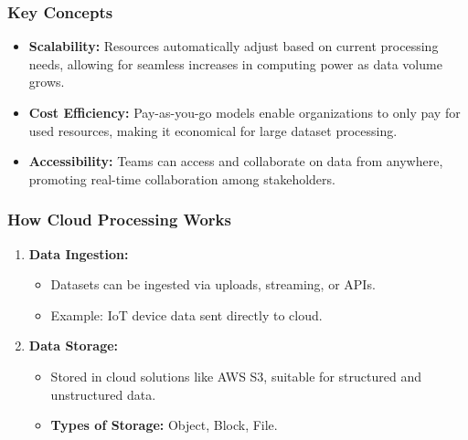 \documentclass[aspectratio=169]{beamer}
\begin{document}
\begin{frame}[fragile]
    \frametitle{Key Concepts}
    \begin{itemize}
        \item \textbf{Scalability:} Resources automatically adjust based on current processing needs, allowing for seamless increases in computing power as data volume grows.
        \item \textbf{Cost Efficiency:} Pay-as-you-go models enable organizations to only pay for used resources, making it economical for large dataset processing.
        \item \textbf{Accessibility:} Teams can access and collaborate on data from anywhere, promoting real-time collaboration among stakeholders.
    \end{itemize}
\end{frame}

\begin{frame}[fragile]
    \frametitle{How Cloud Processing Works}
    \begin{enumerate}
        \item \textbf{Data Ingestion:}
            \begin{itemize}
                \item Datasets can be ingested via uploads, streaming, or APIs.
                \item Example: IoT device data sent directly to cloud.
            \end{itemize}
        \item \textbf{Data Storage:}
            \begin{itemize}
                \item Stored in cloud solutions like AWS S3, suitable for structured and unstructured data.
                \item \textbf{Types of Storage:} Object, Block, File.
            \end{itemize}
    \end{enumerate}
\end{frame}
\end{document}
